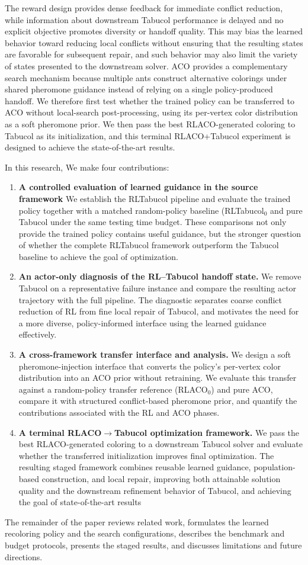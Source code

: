The reward design provides dense feedback for immediate conflict reduction, while information about downstream Tabucol performance is delayed and no explicit objective promotes diversity or handoff quality. This may bias the learned behavior toward reducing local conflicts without ensuring that the resulting states are favorable for subsequent repair, and such behavior may also limit the variety of states presented to the downstream solver. ACO provides a complementary search mechanism because multiple ants construct alternative colorings under shared pheromone guidance instead of relying on a single policy-produced handoff. We therefore first test whether the trained policy can be transferred to ACO without local-search post-processing, using its per-vertex color distribution as a soft pheromone prior. We then pass the best RLACO-generated coloring to Tabucol as its initialization, and this terminal RLACO+Tabucol experiment is designed to achieve the state-of-the-art results.

In this research, We make four contributions:

\begin{enumerate}
\item \textbf{A controlled evaluation of learned guidance in the source framework} We establish the RLTabucol pipeline and evaluate the trained policy together with a matched random-policy baseline (RLTabucol$_0$ and pure Tabucol under the same testing time budget. These comparisons not only provide the trained policy contains useful guidance, but the stronger question of whether the complete RLTabucol framework outperform the Tabucol baseline to achieve the goal of optimization.

\item \textbf{An actor-only diagnosis of the RL--Tabucol handoff state.} We remove Tabucol on a representative failure instance and compare the resulting actor trajectory with the full pipeline. The diagnostic separates coarse conflict reduction of RL from fine local repair of Tabucol, and motivates the need for a more diverse, policy-informed interface using the learned guidance effectively.

\item \textbf{A cross-framework transfer interface and analysis.} We design a soft pheromone-injection interface that converts the policy's per-vertex color distribution into an ACO prior without retraining. We evaluate this transfer against a random-policy transfer reference (RLACO$_0$) and pure ACO, compare it with structured conflict-based pheromone prior, and quantify the contributions associated with the RL and ACO phases.

\item \textbf{A terminal RLACO$\rightarrow$Tabucol optimization framework.}
We pass the best RLACO-generated coloring to a downstream Tabucol solver
and evaluate whether the transferred initialization improves final
optimization. The resulting staged framework combines reusable learned
guidance, population-based construction, and local repair, improving both
attainable solution quality and the downstream refinement behavior of
Tabucol, and achieving the goal of state-of-the-art results
\end{enumerate}

The remainder of the paper reviews related work, formulates the learned recoloring policy and the search configurations, describes the benchmark and budget protocols, presents the staged results, and discusses limitations and future directions.
